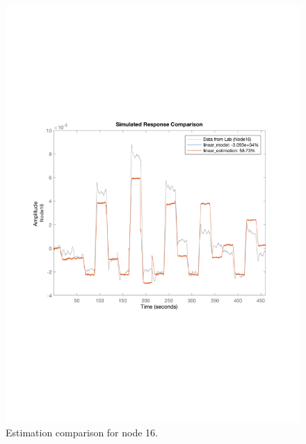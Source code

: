 \begin{figure}[H]
\begin{minipage}[b]{0.45\textwidth}
    \includegraphics[width=\textwidth]{report/pictures/Node16_estimation.pdf}
    \caption{Estimation comparison for node 16.}
  \end{minipage}
\end{figure}

